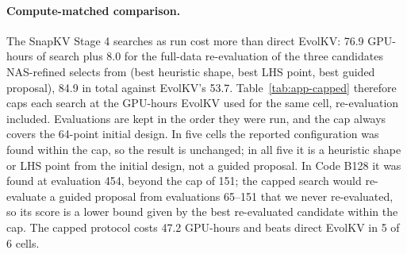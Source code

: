 \paragraph{Compute-matched comparison.} The SnapKV Stage 4 searches as run cost more than direct EvolKV: 76.9 GPU-hours of search plus 8.0 for the full-data re-evaluation of the three candidates NAS-refined selects from (best heuristic shape, best LHS point, best guided proposal), 84.9 in total against EvolKV's 53.7. Table~\ref{tab:app-capped} therefore caps each search at the GPU-hours EvolKV used for the same cell, re-evaluation included. Evaluations are kept in the order they were run, and the cap always covers the 64-point initial design. In five cells the reported configuration was found within the cap, so the result is unchanged; in all five it is a heuristic shape or LHS point from the initial design, not a guided proposal. In Code B128 it was found at evaluation 454, beyond the cap of 151; the capped search would re-evaluate a guided proposal from evaluations 65--151 that we never re-evaluated, so its score is a lower bound given by the best re-evaluated candidate within the cap. The capped protocol costs 47.2 GPU-hours and beats direct EvolKV in 5 of 6 cells.

